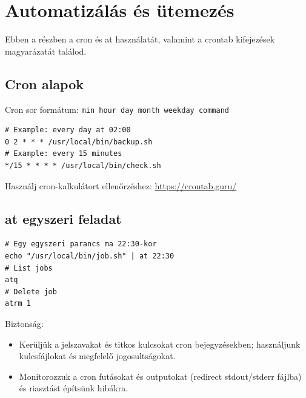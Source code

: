 \section{Automatizálás és ütemezés}

Ebben a részben a cron és at használatát, valamint a crontab kifejezések magyarázatát találod.

\subsection{Cron alapok}
Cron sor formátum: \texttt{min hour day month weekday command}
\begin{lstlisting}
# Example: every day at 02:00
0 2 * * * /usr/local/bin/backup.sh
# Example: every 15 minutes
*/15 * * * * /usr/local/bin/check.sh
\end{lstlisting}

Használj cron-kalkulátort ellenőrzéshez: \url{https://crontab.guru/}

\subsection{at egyszeri feladat}
\begin{lstlisting}
# Egy egyszeri parancs ma 22:30-kor
echo "/usr/local/bin/job.sh" | at 22:30
# List jobs
atq
# Delete job
atrm 1
\end{lstlisting}

Biztonság:
\begin{itemize}
  \item Kerüljük a jelszavakat és titkos kulcsokat cron bejegyzésekben; használjunk kulcsfájlokat és megfelelő jogosultságokat.
  \item Monitorozzuk a cron futásokat és outputokat (redirect stdout/stderr fájlba) és riasztást építsünk hibákra.
\end{itemize}
